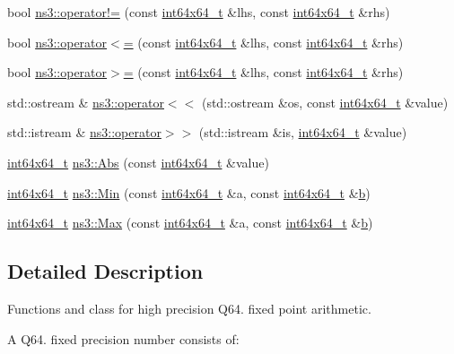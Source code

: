 \begin{DoxyCompactItemize}
bool \hyperlink{group__highprec_gad876786cb1dfba302360a73649bbd8b2}{ns3\+::operator!=} (const \hyperlink{classint64x64__t}{int64x64\+\_\+t} \&lhs, const \hyperlink{classint64x64__t}{int64x64\+\_\+t} \&rhs)
\item 
bool \hyperlink{group__highprec_ga484976d59a10b4aac98c32a3e656ca6c}{ns3\+::operator$<$=} (const \hyperlink{classint64x64__t}{int64x64\+\_\+t} \&lhs, const \hyperlink{classint64x64__t}{int64x64\+\_\+t} \&rhs)
\item 
bool \hyperlink{group__highprec_ga45ce0494cfd96e6cb2e6f7b0a3118922}{ns3\+::operator$>$=} (const \hyperlink{classint64x64__t}{int64x64\+\_\+t} \&lhs, const \hyperlink{classint64x64__t}{int64x64\+\_\+t} \&rhs)
\item 
std\+::ostream \& \hyperlink{group__highprec_gacfc7789be6cdaac56adb76c0d0354d13}{ns3\+::operator$<$$<$} (std\+::ostream \&os, const \hyperlink{classint64x64__t}{int64x64\+\_\+t} \&value)
\item 
std\+::istream \& \hyperlink{group__highprec_gabf6ecbf5acccc352c1b1c0835cac66f2}{ns3\+::operator$>$$>$} (std\+::istream \&is, \hyperlink{classint64x64__t}{int64x64\+\_\+t} \&value)
\item 
\hyperlink{classint64x64__t}{int64x64\+\_\+t} \hyperlink{group__highprec_gabf87260a0ba68d152ae95568b2ef58fe}{ns3\+::\+Abs} (const \hyperlink{classint64x64__t}{int64x64\+\_\+t} \&value)
\item 
\hyperlink{classint64x64__t}{int64x64\+\_\+t} \hyperlink{group__highprec_gacb0b89d5f4363bf77747ff1212f27430}{ns3\+::\+Min} (const \hyperlink{classint64x64__t}{int64x64\+\_\+t} \&a, const \hyperlink{classint64x64__t}{int64x64\+\_\+t} \&\hyperlink{lte__pathloss_8m_a21ad0bd836b90d08f4cf640b4c298e7c}{b})
\item 
\hyperlink{classint64x64__t}{int64x64\+\_\+t} \hyperlink{group__highprec_ga0d35bb9363c0da4cc2557158b95dbca0}{ns3\+::\+Max} (const \hyperlink{classint64x64__t}{int64x64\+\_\+t} \&a, const \hyperlink{classint64x64__t}{int64x64\+\_\+t} \&\hyperlink{lte__pathloss_8m_a21ad0bd836b90d08f4cf640b4c298e7c}{b})
\end{DoxyCompactItemize}


\subsection{Detailed Description}
Functions and class for high precision Q64. fixed point arithmetic.

A Q64. fixed precision number consists of\+:

